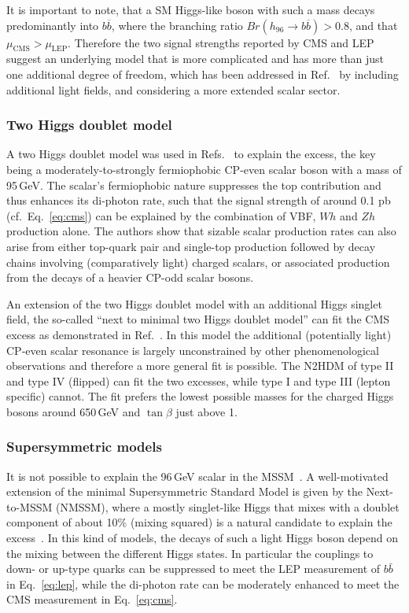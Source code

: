 \documentclass[10pt]{article}
\begin{document}
It is important to note, that a SM Higgs-like boson with such a mass decays predominantly into $b\overline{b}$, where the branching ratio $Br(h_{96}\rightarrow b\overline{b})>0.8$, and that $\mu_\text{CMS} > \mu_\text{LEP}$. 
Therefore the two signal strengths reported by CMS and LEP suggest an underlying model that is more complicated and has more than just one additional degree of freedom, which has been addressed in Ref.~\cite{Fox:2017uwr} by including additional light fields, and considering a more extended scalar sector.


\subsubsection{Two Higgs doublet model}
%
A two Higgs doublet model was used in Refs.~\cite{Fox:2017uwr,Haisch:2017gql} to explain the excess, the key being a moderately-to-strongly fermiophobic CP-even scalar boson with a mass of 95\,GeV.
The scalar's fermiophobic nature suppresses the top contribution and thus enhances its di-photon rate, such that the signal strength of around 0.1 pb (cf.\ Eq.~\eqref{eq:cms}) can be explained by the combination of VBF, $Wh$ and $Zh$ production alone. 
The authors show that sizable scalar production rates can also arise from either top-quark pair and single-top production followed by decay chains involving (comparatively light) charged scalars, or associated production from the decays of a heavier CP-odd scalar bosons.

An extension of the two Higgs doublet model with an additional Higgs singlet field, the so-called ``next to minimal two Higgs doublet model'' can fit the CMS excess as demonstrated in Ref.~\cite{Biekotter:2019kde}. 
In this model the additional (potentially light) CP-even scalar resonance is largely unconstrained by other phenomenological observations and therefore a more general fit is possible.
The N2HDM of type II and type IV (flipped) can fit the two excesses, while type I and
type III (lepton specific) cannot. 
The fit prefers the lowest possible masses for the charged Higgs bosons around 650\,GeV and $\tan\beta$ just above 1.


\subsubsection{Supersymmetric models}
%
It is not possible to explain the 96\,GeV scalar in the MSSM~\cite{Bechtle:2016kui}. A well-motivated extension of the minimal Supersymmetric Standard Model is given by the Next-to-MSSM (NMSSM), where a mostly singlet-like Higgs that mixes with a doublet component of about 10\% (mixing squared) is a natural candidate to explain the excess~\cite{Heinemeyer:2018wzl,Domingo:2018uim}.
In this kind of models, the decays of such a light Higgs boson depend on the mixing between the different Higgs states.
In particular the couplings to down- or up-type quarks can be suppressed to meet the LEP measurement of $b\bar b$ in Eq.~\eqref{eq:lep}, while the di-photon rate can be moderately enhanced to meet the CMS measurement in Eq.~\eqref{eq:cms}.
\end{document}
